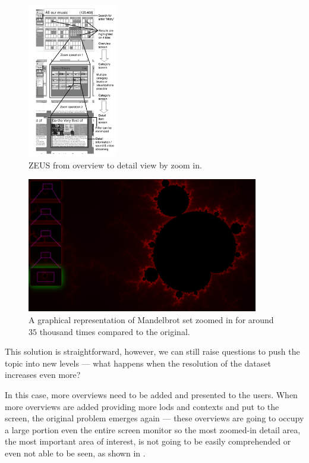 \begin{figure}[H]
\centering
\includegraphics[width=0.35\textwidth,keepaspectratio]{Figures/Chapter1/zeus.png}
\decoRule
\caption[Multiple Levels of Overview Plus Details]{ZEUS from overview to detail view by zoom in\cite{gundelsweiler2007zeus}.}
\label{fig:zeus}
\end{figure}

\begin{figure}[H]
\centering
\includegraphics[width=0.9\textwidth,keepaspectratio]{Figures/Chapter1/multiplelevels.png}
\decoRule
\caption[Zoomed-in Fractal Image]{A graphical representation of Mandelbrot set zoomed in for around $35$ thousand times compared to the original.}
\label{fig:multiplelevels}
\end{figure}

This solution is straightforward, however, we can still raise questions to push the topic into new levels --- what happens when the resolution of the dataset increases even more?

In this case, more overviews need to be added and presented to the users. When more overviews are added providing more \glspl{lod} and contexts and put to the screen, the original problem emerges again --- these overviews are going to occupy a large portion even the entire screen monitor so the most zoomed-in detail area, the most important area of interest, is not going to be easily comprehended or even not able to be seen, as shown in . 

